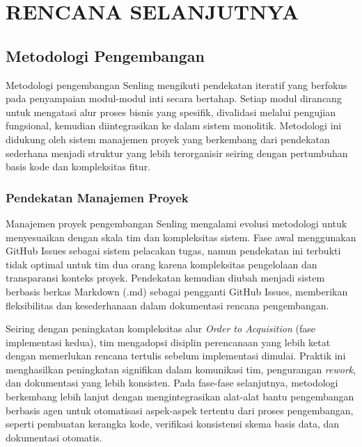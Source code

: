 \chapter{RENCANA SELANJUTNYA}
\label{chap:rencana-selanjutnya}

\section{Metodologi Pengembangan}

Metodologi pengembangan Senling mengikuti pendekatan iteratif yang berfokus pada penyampaian modul-modul inti secara bertahap. Setiap modul dirancang untuk mengatasi alur proses bisnis yang spesifik, divalidasi melalui pengujian fungsional, kemudian diintegrasikan ke dalam sistem monolitik. Metodologi ini didukung oleh sistem manajemen proyek yang berkembang dari pendekatan sederhana menjadi struktur yang lebih terorganisir seiring dengan pertumbuhan basis kode dan kompleksitas fitur.

\subsection{Pendekatan Manajemen Proyek}

Manajemen proyek pengembangan Senling mengalami evolusi metodologi untuk menyesuaikan dengan skala tim dan kompleksitas sistem. Fase awal menggunakan GitHub Issues sebagai sistem pelacakan tugas, namun pendekatan ini terbukti tidak optimal untuk tim dua orang karena kompleksitas pengelolaan dan transparansi konteks proyek. Pendekatan kemudian diubah menjadi sistem berbasis berkas Markdown (.md) sebagai pengganti GitHub Issues, memberikan fleksibilitas dan kesederhanaan dalam dokumentasi rencana pengembangan.

Seiring dengan peningkatan kompleksitas alur \textit{Order to Acquisition} (fase implementasi kedua), tim mengadopsi disiplin perencanaan yang lebih ketat dengan memerlukan rencana tertulis sebelum implementasi dimulai. Praktik ini menghasilkan peningkatan signifikan dalam komunikasi tim, pengurangan \textit{rework}, dan dokumentasi yang lebih konsisten. Pada fase-fase selanjutnya, metodologi berkembang lebih lanjut dengan mengintegrasikan alat-alat bantu pengembangan berbasis agen untuk otomatisasi aspek-aspek tertentu dari proses pengembangan, seperti pembuatan kerangka kode, verifikasi konsistensi skema basis data, dan dokumentasi otomatis.

